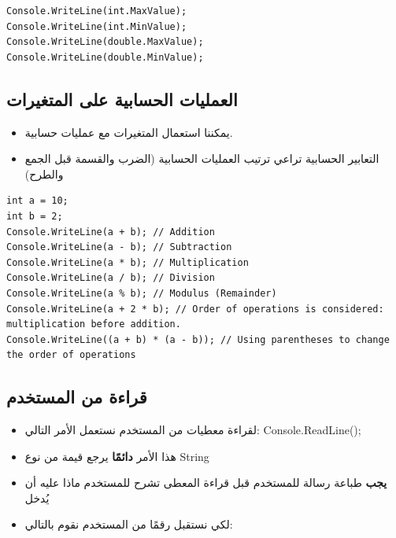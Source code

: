 \documentclass[14pt]{extarticle}
\begin{document}
\begin{boxExample}
\begin{english}
\begin{verbatim}
Console.WriteLine(int.MaxValue);
Console.WriteLine(int.MinValue);
Console.WriteLine(double.MaxValue);
Console.WriteLine(double.MinValue);
\end{verbatim}
\end{english}
\end{boxExample}

\subsection{العمليات الحسابية على المتغيرات}

\begin{itemize}
\item يمكننا استعمال المتغيرات مع عمليات حسابية.
\item التعابير الحسابية تراعي ترتيب العمليات الحسابية (الضرب والقسمة قبل الجمع والطرح)
\end{itemize}

\begin{boxExample}
\begin{english}
\begin{verbatim}
int a = 10;
int b = 2;
Console.WriteLine(a + b); // Addition
Console.WriteLine(a - b); // Subtraction
Console.WriteLine(a * b); // Multiplication
Console.WriteLine(a / b); // Division
Console.WriteLine(a % b); // Modulus (Remainder)
Console.WriteLine(a + 2 * b); // Order of operations is considered: multiplication before addition.
Console.WriteLine((a + b) * (a - b)); // Using parentheses to change the order of operations
\end{verbatim}
\end{english}
\end{boxExample}

\subsection{قراءة من المستخدم}

\begin{itemize}
\item لقراءة معطيات من المستخدم نستعمل الأمر التالي:
\textenglish{Console.ReadLine();}
\item هذا الأمر \textbf{دائمًا} يرجع قيمة من نوع \textenglish{String}
\item \textbf{يجب} طباعة رسالة للمستخدم قبل قراءة المعطى تشرح للمستخدم ماذا عليه أن يُدخل
\item لكي نستقبل رقمًا من المستخدم نقوم بالتالي:
\end{itemize}
\end{document}
